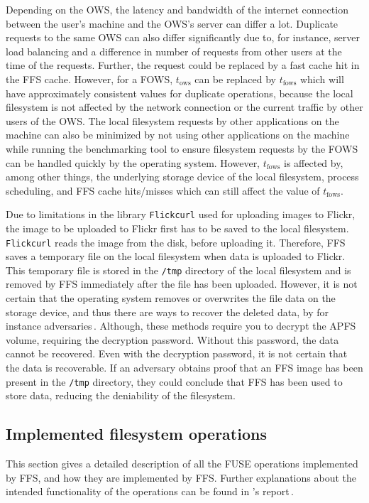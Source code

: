 Depending on the \gls{OWS}, the latency and bandwidth of the internet connection between the user's machine and the \gls{OWS}'s server can differ a lot. Duplicate requests to the same \gls{OWS} can also differ significantly due to, for instance, server load balancing and a difference in number of requests from other users at the time of the requests. Further, the request could be replaced by a fast cache hit in the \gls{FFS} cache. However, for a \gls{FOWS}, $t_\text{ows}$ can be replaced by $t_\text{fows}$ which will have approximately consistent values for duplicate operations, because the local filesystem is not affected by the network connection or the current traffic by other users of the \gls{OWS}. The local filesystem requests by other applications on the machine can also be minimized by not using other applications on the machine while running the benchmarking tool to ensure filesystem requests by the \gls{FOWS} can be handled quickly by the operating system. However, $t_\text{fows}$ is affected by, among other things, the underlying storage device of the local filesystem, process scheduling, and \gls{FFS} cache hits/misses which can still affect the value of $t_\text{fows}$.

Due to limitations in the library \texttt{Flickcurl} used for uploading images to Flickr, the image to be uploaded to Flickr first has to be saved to the local filesystem. \texttt{Flickcurl} reads the image from the disk, before uploading it. Therefore, \gls{FFS} saves a temporary file on the local filesystem when data is uploaded to Flickr. This temporary file is stored in the \texttt{/tmp} directory of the local filesystem and is removed by \gls{FFS} immediately after the file has been uploaded. However, it is not certain that the operating system removes or overwrites the file data on the storage device, and thus there are ways to recover the deleted data, by for instance adversaries\,\cite{llcsysdevlaboratoriesHowRecoverData2022,cedricAPFSDataRecovery2022,santosHowRecoverData2021}. Although, these methods require you to decrypt the \gls{APFS} volume, requiring the decryption password. Without this password, the data cannot be recovered. Even with the decryption password, it is not certain that the data is recoverable. If an adversary obtains proof that an \gls{FFS} image has been present in the \texttt{/tmp} directory, they could conclude that \gls{FFS} has been used to store data, reducing the deniability of the filesystem.

\subsection{Implemented filesystem operations}
\label{subsec:file_op}
This section gives a detailed description of all the \gls{FUSE} operations implemented by \gls{FFS}, and how they are implemented by \gls{FFS}. Further explanations about the intended functionality of the operations can be found in \citeauthor{kuenningCS135FUSEDocumentation2010}'s report\,\cite{kuenningCS135FUSEDocumentation2010}. 

